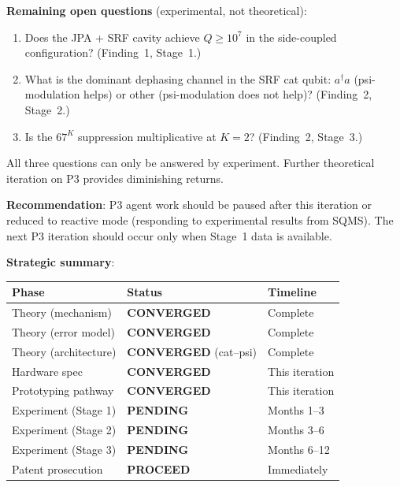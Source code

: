 \documentclass[11pt]{article}
\theoremstyle{definition}
\theoremstyle{remark}
\begin{document}
\begin{tcolorbox}[colback=blue!5!white, colframe=blue!60!black,
  title=\textbf{W4i16 TOP 5 FINDINGS --- READ FIRST}]
\begin{enumerate}[nosep]
  \textbf{Remaining open questions} (experimental, not theoretical):
  \begin{enumerate}[nosep]
    \item Does the JPA + SRF cavity achieve $Q \geq 10^7$ in the
      side-coupled configuration?  (Finding~1, Stage~1.)
    \item What is the dominant dephasing channel in the SRF cat
      qubit: $a^\dagger a$ (psi-modulation helps) or other
      (psi-modulation does not help)?  (Finding~2, Stage~2.)
    \item Is the $67^K$ suppression multiplicative at $K=2$?
      (Finding~2, Stage~3.)
  \end{enumerate}

  All three questions can only be answered by experiment.  Further
  theoretical iteration on P3 provides diminishing returns.

  \textbf{Recommendation}: P3 agent work should be paused after
  this iteration or reduced to reactive mode (responding to
  experimental results from SQMS).  The next P3 iteration should
  occur only when Stage~1 data is available.

  \textbf{Strategic summary}:
  \begin{center}
  \begin{tabular}{@{}lll@{}}
  \toprule
  Phase & Status & Timeline \\
  \midrule
  Theory (mechanism) & \textbf{CONVERGED} & Complete \\
  Theory (error model) & \textbf{CONVERGED} & Complete \\
  Theory (architecture) & \textbf{CONVERGED} (cat--psi) & Complete \\
  Hardware spec & \textbf{CONVERGED} & This iteration \\
  Prototyping pathway & \textbf{CONVERGED} & This iteration \\
  Experiment (Stage 1) & \textbf{PENDING} & Months 1--3 \\
  Experiment (Stage 2) & \textbf{PENDING} & Months 3--6 \\
  Experiment (Stage 3) & \textbf{PENDING} & Months 6--12 \\
  Patent prosecution & \textbf{PROCEED} & Immediately \\
  \bottomrule
  \end{tabular}
  \end{center}

\end{enumerate}
\end{tcolorbox}
\end{document}
